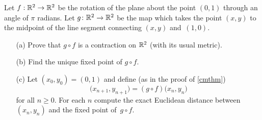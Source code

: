 \begin{prob} Let $f:\mathbb{R}^2 \rightarrow \mathbb{R}^2$ be the rotation of the plane about the point $(0,1)$ through an
angle of $\pi$ radians.  Let $g \colon \mathbb{R}^2 \rightarrow \mathbb{R}^2$ be the map which takes the point $(x,y)$ to
the midpoint of the line segment connecting $(x,y)$ and~$(1,0)$.
 \begin{enumerate}
  \item[(a)] Prove that $g \circ f$ is a contraction on $\mathbb{R}^2$ (with its usual metric).
  \item[(b)] Find the unique fixed point of $g \circ f$.
  \item[(c)] Let $(x_0,y_0) = (0,1)$ and define (as in the proof of \ref{cmthm})
   \[ \bigl(x_{n+1},y_{n+1}\bigr) = (g \circ f)\bigl(x_n,y_n\bigr) \]
for all $n \ge 0$.  For each $n$ compute the exact Euclidean distance between $(x_n,y_n)$ and the
fixed point of~$g \circ f$.
 \end{enumerate}
\end{prob}






